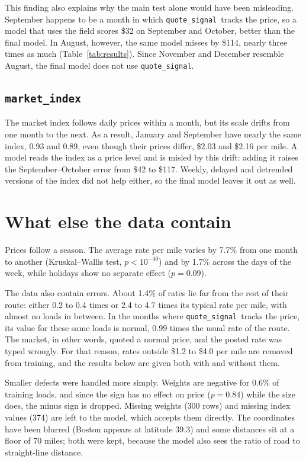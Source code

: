 \documentclass[11pt,a4paper]{article}
\newcommand{\var}[1]{\texttt{#1}}
\newcommand{\qs}{\var{quote\_signal}}
\newcommand{\mi}{\var{market\_index}}
\begin{document}
This finding also explains why the main test alone would have been misleading.
September happens to be a month in which \qs\ tracks the price, so a model that uses the field scores \$32 on September and October, better than the final model.
In August, however, the same model misses by \$114, nearly three times as much (Table~\ref{tab:results}).
Since November and December resemble August, the final model does not use \qs.

\subsection{\mi}

The market index follows daily prices within a month, but its scale drifts from one month to the next.
As a result, January and September have nearly the same index, 0.93 and 0.89, even though their prices differ, \$2.03 and \$2.16 per mile.
A model reads the index as a price level and is misled by this drift: adding it raises the September--October error from \$42 to \$117.
Weekly, delayed and detrended versions of the index did not help either, so the final model leaves it out as well.

\section{What else the data contain}

Prices follow a season.
The average rate per mile varies by 7.7\% from one month to another (Kruskal--Wallis test, $p < 10^{-40}$) and by 1.7\% across the days of the week, while holidays show no separate effect ($p = 0.09$).

The data also contain errors.
About 1.4\% of rates lie far from the rest of their route: either 0.2 to 0.4 times or 2.4 to 4.7 times its typical rate per mile, with almost no loads in between.
In the months where \qs\ tracks the price, its value for these same loads is normal, 0.99 times the usual rate of the route.
The market, in other words, quoted a normal price, and the posted rate was typed wrongly.
For that reason, rates outside \$1.2 to \$4.0 per mile are removed from training, and the results below are given both with and without them.

Smaller defects were handled more simply.
Weights are negative for 0.6\% of training loads, and since the sign has no effect on price ($p = 0.84$) while the size does, the minus sign is dropped.
Missing weights (300 rows) and missing index values (374) are left to the model, which accepts them directly.
The coordinates have been blurred (Boston appears at latitude 39.3) and some distances sit at a floor of 70 miles; both were kept, because the model also sees the ratio of road to straight-line distance.
\end{document}
